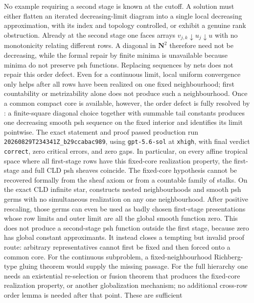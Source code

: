 No example requiring a second stage is known at the cutoff.  A solution must
either flatten an iterated decreasing-limit diagram into a single local
decreasing approximation, with its index and topology controlled, or exhibit
a genuine rank obstruction.  Already at the second stage one faces arrays
$v_{j,k}\downarrow u_j\downarrow u$ with no monotonicity relating different
rows.  A diagonal in $\mathbf N^2$ therefore need not be decreasing, while
the formal repair by finite minima is unavailable because minima do not
preserve psh functions.  Replacing sequences by nets does not repair this
order defect.  Even for a continuous limit, local uniform convergence only
helps after all rows have been realized on one fixed neighbourhood; first
countability or metrizability alone does not produce such a neighbourhood.
Once a common compact core is available, however, the order defect is fully
resolved by : a finite-square diagonal
choice together with summable tail constants produces one decreasing smooth
psh sequence on the fixed interior and identifies its limit pointwise.  The
exact statement and proof passed production run
\nolinkurl{20260829T234341Z_b29ccabac989}, using
\texttt{gpt-5.6-sol} at \texttt{xhigh}, with final verdict
\texttt{correct}, zero critical errors, and zero gaps.  In particular, on
every affine tropical space where all first-stage rows have this fixed-core
realization property, the first-stage and full CLD psh sheaves coincide.
The fixed-core hypothesis cannot be recovered formally from the sheaf axiom
or from a countable family of stalks.  On the exact CLD infinite star,
 constructs nested
neighbourhoods and smooth psh germs with no simultaneous realization on any
one neighbourhood.  After positive rescaling, those germs can even be used
as badly chosen first-stage presentations whose row limits and outer limit
are all the global smooth function zero.  This does not produce a
second-stage psh function outside the first stage, because zero has global
constant approximants.  It instead closes a tempting but invalid proof
route: arbitrary representatives cannot first be fixed and then forced onto
a common core.
For the continuous subproblem, a fixed-neighbourhood Richberg-type gluing
theorem would supply the missing passage.  For the full hierarchy one needs
an existential re-selection or fusion theorem that produces the fixed-core
realization property, or another globalization mechanism; no additional
cross-row order lemma is needed after that point.  These are sufficient
